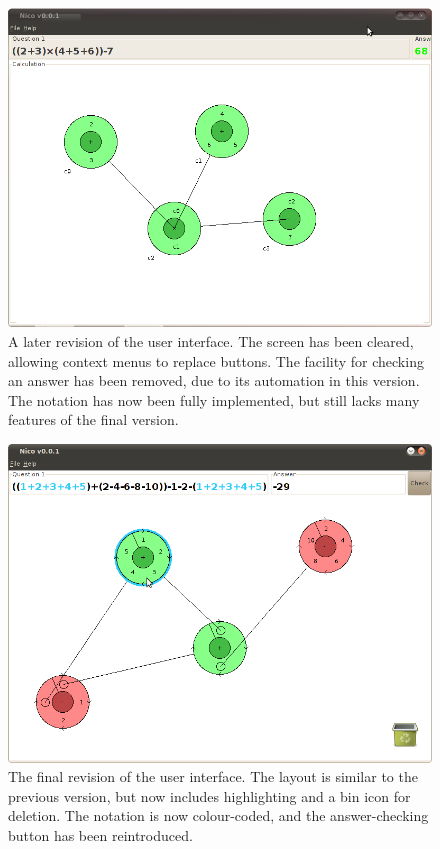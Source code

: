 \documentclass[12pt,twoside,notitlepage,xetex]{report}
\begin{document}
{\begin{center}
\begin{figure}[H]
\begin{center}
\includegraphics[width=\textwidth-4cm]{figs/nico_screen_older.png}
\end{center}
\caption{A later revision of the user interface.  The screen has been cleared, allowing context menus to replace buttons.  The facility for checking an answer has been removed, due to its automation in this version.  The notation has now been fully implemented, but still lacks many features of the final version.}
\label{fig:OldApps2}
\end{figure}
\end{center}

\begin{center}
\begin{figure}[H]
\begin{center}
\includegraphics[width=\textwidth-4cm]{figs/nico_screen_new.png}
\end{center}
\caption{The final revision of the user interface.  The layout is similar to the previous version, but now includes highlighting and a bin icon for deletion.  The notation is now colour-coded, and the answer-checking button has been reintroduced.}
\label{fig:OldApps3}
\end{figure}
\end{center}

}
\end{document}
